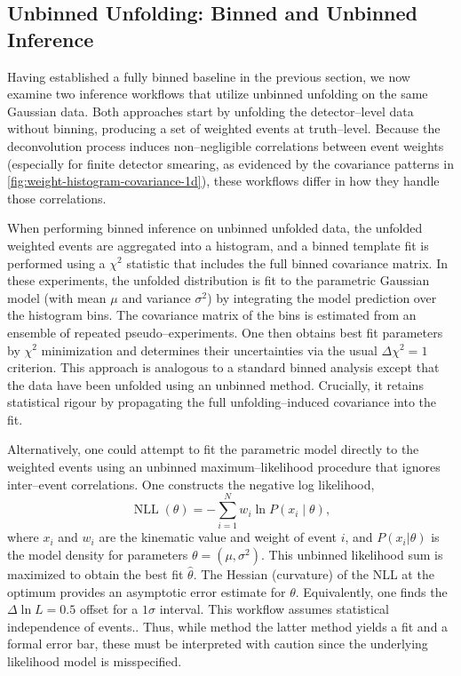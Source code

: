     \subsection{Unbinned Unfolding: Binned and Unbinned Inference}
    \label{subsec:unbinned_data}
        Having established a fully binned baseline in the previous section, we now examine two inference workflows that utilize unbinned unfolding on the same Gaussian data.
        Both approaches start by unfolding the detector--level data without binning, producing a set of weighted events at truth--level.
        Because the deconvolution process induces non--negligible correlations between event weights (especially for finite detector smearing, as evidenced by the covariance patterns in \cref{fig:weight-histogram-covariance-1d}), these workflows differ in how they handle those correlations.
    
        When performing binned inference on unbinned unfolded data, the unfolded weighted events are aggregated into a histogram, and a binned template fit is performed using a $\chi^2$ statistic that includes the full binned covariance matrix.
        In these experiments, the unfolded distribution is fit to the parametric Gaussian model (with mean $\mu$ and variance $\sigma^2$) by integrating the model prediction over the histogram bins.
        The covariance matrix of the bins is estimated from an ensemble of repeated pseudo--experiments.
        One then obtains best fit parameters by $\chi^2$ minimization and determines their uncertainties via the usual $\Delta\chi^2=1$ criterion.
        This approach is analogous to a standard binned analysis except that the data have been unfolded using an unbinned method.
        Crucially, it retains statistical rigour by propagating the full unfolding--induced covariance into the fit.
    
        Alternatively, one could attempt to fit the parametric model directly to the weighted events using an unbinned maximum--likelihood procedure that ignores inter--event correlations.
        One constructs the negative log likelihood,
        \[
            \operatorname{NLL}(\theta) = -\sum_{i=1}^N w_i \ln P(x_i \mid \theta),
        \]
        where $x_i$ and $w_i$ are the kinematic value and weight of event $i$, and $P(x_i|\theta)$ is the model density for parameters $\theta=(\mu,\sigma^2)$.
        This unbinned likelihood sum is maximized to obtain the best fit $\hat\theta$.
        The Hessian (curvature) of the NLL at the optimum provides an asymptotic error estimate for $\theta$.
        Equivalently, one finds the $\Delta\ln L=0.5$ offset for a $1\sigma$ interval.
        This workflow assumes statistical independence of events..
        Thus, while method the latter method yields a fit and a formal error bar, these must be interpreted with caution since the underlying likelihood model is misspecified.
    
